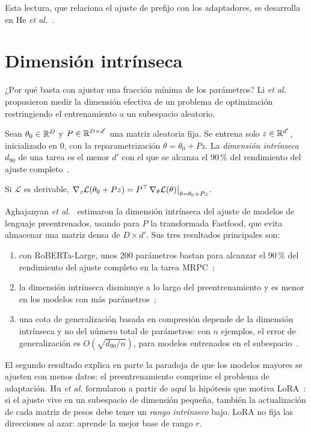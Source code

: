Esta lectura, que relaciona el ajuste de prefijo con los adaptadores, se desarrolla en He \emph{et al.}~\cite{he-unified}.

\section{Dimensión intrínseca}\label{sec:intrinseca}

¿Por qué basta con ajustar una fracción mínima de los parámetros? Li \emph{et al.}~\cite{li-intrinsic} propusieron medir la dimensión efectiva de un problema de optimización restringiendo el entrenamiento a un subespacio aleatorio.

\begin{definicion}\label{def:intrinseca}
Sean $\theta_0\in\mathbb{R}^{D}$ y $P\in\mathbb{R}^{D\times d'}$ una matriz aleatoria fija. Se entrena solo $z\in\mathbb{R}^{d'}$, inicializado en $0$, con la reparametrización $\theta=\theta_0+Pz$. La \emph{dimensión intrínseca} $d_{90}$ de una tarea es el menor $d'$ con el que se alcanza el $90\,\%$ del rendimiento del ajuste completo~\cite[§3]{aghajanyan}.
\end{definicion}

\begin{proposicion}\label{prop:grad-subespacio}
Si $\mathcal{L}$ es derivable, $\nabla_z\mathcal{L}(\theta_0+Pz)=P^{\top}\,\nabla_\theta\mathcal{L}(\theta)\big|_{\theta=\theta_0+Pz}$.
\end{proposicion}

Aghajanyan \emph{et al.}~\cite{aghajanyan} estimaron la dimensión intrínseca del ajuste de modelos de lenguaje preentrenados, usando para $P$ la transformada Fastfood, que evita almacenar una matriz densa de $D\times d'$. Sus tres resultados principales son:
\begin{enumerate}
  \item con RoBERTa-Large, unos 200 parámetros bastan para alcanzar el $90\,\%$ del rendimiento del ajuste completo en la tarea MRPC~\cite[§4.2]{aghajanyan};
  \item la dimensión intrínseca disminuye a lo largo del preentrenamiento y es menor en los modelos con más parámetros~\cite[§5.1 y~§5.2]{aghajanyan};
  \item una cota de generalización basada en compresión depende de la dimensión intrínseca y no del número total de parámetros: con $n$ ejemplos, el error de generalización es $O(\sqrt{d_{90}/n})$, para modelos entrenados en el subespacio~\cite[§5.3]{aghajanyan}.
\end{enumerate}

\begin{observacion}
El segundo resultado explica en parte la paradoja de que los modelos mayores se ajusten con menos datos: el preentrenamiento comprime el problema de adaptación. Hu \emph{et al.} formularon a partir de aquí la hipótesis que motiva LoRA~\cite[§1 y~§4.1]{hu-lora}: si el ajuste vive en un subespacio de dimensión pequeña, también la actualización de cada matriz de pesos debe tener un \emph{rango intrínseco} bajo. LoRA no fija las direcciones al azar: aprende la mejor base de rango $r$.
\end{observacion}

